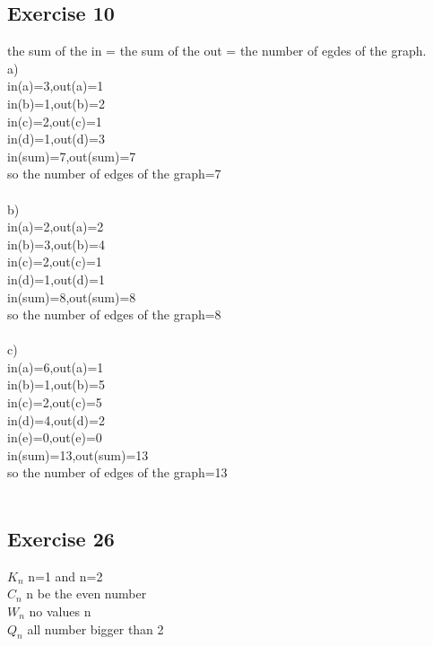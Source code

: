 \documentclass[12pt]{article}
\begin{document}
\subsection*{Exercise 10}
the sum of the in = the sum of the out = the number of egdes of the graph.\\
a)\\
in(a)=3,out(a)=1\\
in(b)=1,out(b)=2\\
in(c)=2,out(c)=1\\
in(d)=1,out(d)=3\\
in(sum)=7,out(sum)=7\\
so the number of edges of the graph=7\\
\\
b)\\
in(a)=2,out(a)=2\\
in(b)=3,out(b)=4\\
in(c)=2,out(c)=1\\
in(d)=1,out(d)=1\\
in(sum)=8,out(sum)=8\\
so the number of edges of the graph=8\\
\\
c)\\
in(a)=6,out(a)=1\\
in(b)=1,out(b)=5\\
in(c)=2,out(c)=5\\
in(d)=4,out(d)=2\\
in(e)=0,out(e)=0\\
in(sum)=13,out(sum)=13\\
so the number of edges of the graph=13\\
\\
\subsection*{Exercise 26}
$K_n$ n=1 and n=2\\
$C_n$ n be the even number\\
$W_n$ no values n\\
$Q_n$ all number bigger than 2\\
\\
\end{document}
